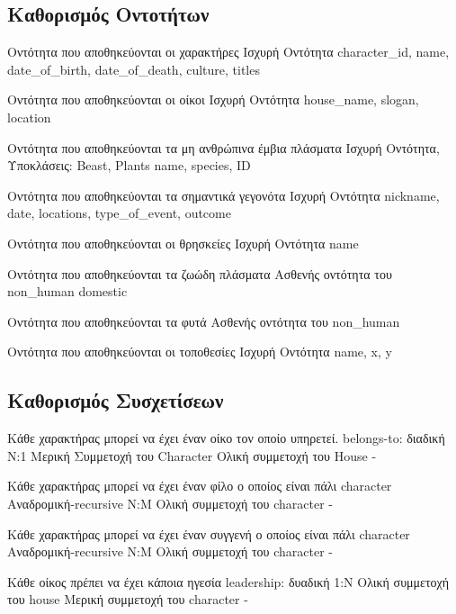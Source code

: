\documentclass[../main.tex]{subfiles}
\begin{document}
\subsection{Καθορισμός Οντοτήτων}

{Οντότητα που αποθηκεύονται οι χαρακτήρες}
{Ισχυρή Οντότητα}
{character\_id, name, date\_of\_birth, date\_of\_death, culture, titles}

{Οντότητα που αποθηκεύονται οι οίκοι}
{Ισχυρή Οντότητα}
{house\_name, slogan, location}

{Οντότητα που αποθηκεύονται τα μη ανθρώπινα έμβια πλάσματα}
{Ισχυρή Οντότητα, Υποκλάσεις: Beast, Plants}
{name, species, ID}

{Οντότητα που αποθηκεύονται τα σημαντικά γεγονότα}
{Ισχυρή Οντότητα}
{nickname, date, locations, type\_of\_event, outcome}

{Οντότητα που αποθηκεύονται οι θρησκείες}
{Ισχυρή Οντότητα}
{name}

{Οντότητα που αποθηκεύονται τα ζωώδη πλάσματα}
{Ασθενής οντότητα του non\_human}
{domestic}

{Οντότητα που αποθηκεύονται τα φυτά}
{Ασθενής οντότητα του non\_human}
{}

{Οντότητα που αποθηκεύονται οι τοποθεσίες}
{Ισχυρή Οντότητα}
{name, x, y}

\subsection{Καθορισμός Συσχετίσεων}

{Κάθε χαρακτήρας μπορεί να έχει έναν οίκο τον οποίο υπηρετεί.}
{belongs-to: διαδική}
{N:1}
{Μερική Συμμετοχή του Character \newline Ολική συμμετοχή του House}
{-}

{Κάθε χαρακτήρας μπορεί να έχει έναν φίλο ο οποίος είναι πάλι character}
{Αναδρομική-recursive}
{N:M}
{Ολική συμμετοχή του character}
{-}

{Κάθε χαρακτήρας μπορεί να έχει έναν συγγενή ο οποίος είναι πάλι character}
{Αναδρομική-recursive}
{N:M}
{Ολική συμμετοχή του character}
{-}

{Κάθε οίκος πρέπει να έχει κάποια ηγεσία}
{leadership: δυαδική}
{1:Ν}
{Ολική συμμετοχή του house \newline Μερική συμμετοχή του character}
{-}
\end{document}
